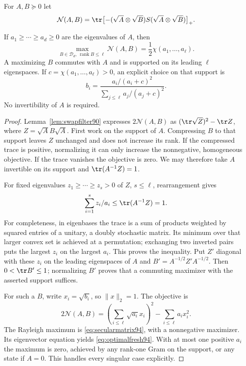 For $A,B\succeq0$ let
\[
 \mathcal N(A,B)=\tr\bigl[-(\sqrt A\otimes\sqrt B)S
                                  (\sqrt A\otimes\sqrt B)\bigr]_+.
\]
\begin{lemma}
\label{lem:spectralleaf94}
If $a_1\ge\cdots\ge a_d\ge0$ are the eigenvalues of $A$, then
\begin{equation}\label{eq:spectralleaf94}
 \max_{B\in\mathcal D_d,\ \operatorname{rank}B\le\ell}
                  \mathcal N(A,B)
           =\frac12\chi(a_1,\ldots,a_\ell).
\end{equation}
A maximizing $B$ commutes with $A$ and is supported on its leading
$\ell$ eigenspaces.  If $c=\chi(a_1,\ldots,a_\ell)>0$, an explicit
choice on that support is
\begin{equation}\label{eq:optimalfresh94}
 b_i=\frac{a_i/(a_i+c)^2}{\sum_{j\le\ell}a_j/(a_j+c)^2}.
\end{equation}
No invertibility of $A$ is required.
\end{lemma}
\begin{proof}
Lemma~\ref{lem:swapfilter90} expresses $2\mathcal N(A,B)$ as
$(\tr\sqrt Z)^2-\tr Z$, where $Z=\sqrt A B\sqrt A$.
First work on the support of $A$.  Compressing $B$ to that support
leaves $Z$ unchanged and does not increase its rank.  If the compressed
trace is positive, normalizing it can only increase the nonnegative,
homogeneous objective.  If the trace vanishes the objective is zero.
We may therefore take $A$ invertible on its support and
$\tr(A^{-1}Z)=1$.

For fixed eigenvalues $z_1\ge\cdots\ge z_s>0$ of $Z$, $s\le\ell$,
rearrangement gives
\[
                  \sum_{i=1}^s z_i/a_i\le\tr(A^{-1}Z)=1.
\]
For completeness, in eigenbases the trace is a sum of products weighted
by squared entries of a unitary, a doubly stochastic matrix.  Its
minimum over that larger convex set is achieved at a permutation;
exchanging two inverted pairs puts the largest $z_i$ on the largest
$a_i$.  This proves the inequality.  Put $Z'$ diagonal with these
$z_i$ on the leading eigenspaces of $A$ and
$B'=A^{-1/2}Z'A^{-1/2}$.  Then $0<\tr B'\le1$;
normalizing $B'$ proves that a commuting maximizer with the asserted
support suffices.

For such a $B$, write $x_i=\sqrt{b_i}$, so $\|x\|_2=1$.  The objective
is
\[
 2\mathcal N(A,B)
       =\left(\sum_{i\le\ell}\sqrt{a_i}x_i\right)^2
                          -\sum_{i\le\ell}a_ix_i^2.
\]
The Rayleigh maximum is \eqref{eq:secularmatrix94}, with a nonnegative
maximizer.  Its eigenvector equation yields
\eqref{eq:optimalfresh94}.  With at most one positive $a_i$ the maximum
is zero, achieved by any rank-one Gram on the support, or any state if
$A=0$.  This handles every singular case explicitly.
\end{proof}

